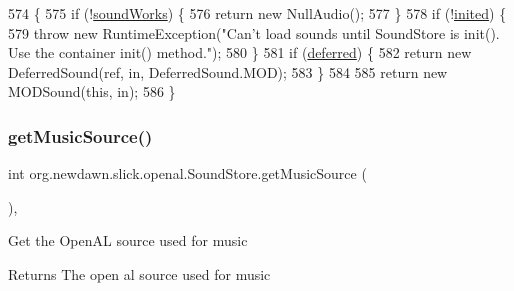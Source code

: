 \begin{DoxyCode}
574                                                                        \{
575         \textcolor{keywordflow}{if} (!\mbox{\hyperlink{classorg_1_1newdawn_1_1slick_1_1openal_1_1_sound_store_ae563e9c1a01e333dc2350f1450f451fd}{soundWorks}}) \{
576             \textcolor{keywordflow}{return} \textcolor{keyword}{new} NullAudio();
577         \}
578         \textcolor{keywordflow}{if} (!\mbox{\hyperlink{classorg_1_1newdawn_1_1slick_1_1openal_1_1_sound_store_ad607db06655c505a0d3aa73eb16a06e1}{inited}}) \{
579             \textcolor{keywordflow}{throw} \textcolor{keyword}{new} RuntimeException(\textcolor{stringliteral}{"Can't load sounds until SoundStore is init(). Use the container
       init() method."});
580         \}
581         \textcolor{keywordflow}{if} (\mbox{\hyperlink{classorg_1_1newdawn_1_1slick_1_1openal_1_1_sound_store_a19c18b8305a40c99b51cde881a6f1d32}{deferred}}) \{
582             \textcolor{keywordflow}{return} \textcolor{keyword}{new} DeferredSound(ref, in, DeferredSound.MOD);
583         \}
584         
585         \textcolor{keywordflow}{return} \textcolor{keyword}{new} MODSound(\textcolor{keyword}{this}, in);
586     \}
\end{DoxyCode}
\mbox{\label{classorg_1_1newdawn_1_1slick_1_1openal_1_1_sound_store_ac2d5dca8d89e5fe899691ddb4be2fc12}} 
\subsubsection{\texorpdfstring{get\+Music\+Source()}{getMusicSource()}}
{\footnotesize\ttfamily int org.\+newdawn.\+slick.\+openal.\+Sound\+Store.\+get\+Music\+Source (\begin{DoxyParamCaption}{ }\end{DoxyParamCaption})\hspace{0.3cm}{\ttfamily [inline]}, {\ttfamily [private]}}

Get the Open\+AL source used for music

\begin{DoxyReturn}{Returns}
The open al source used for music 
\end{DoxyReturn}

